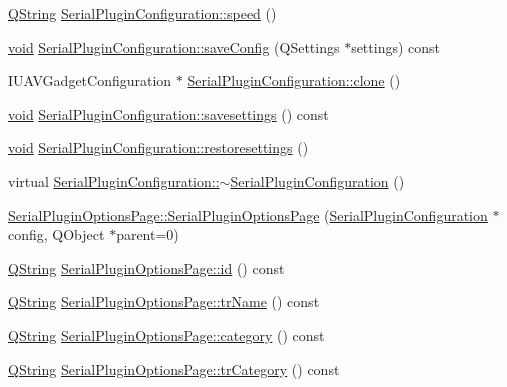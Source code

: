 \begin{DoxyCompactItemize}
\item 
\hyperlink{group___u_a_v_objects_plugin_gab9d252f49c333c94a72f97ce3105a32d}{\-Q\-String} \hyperlink{group___serial_plugin_ga1e6623a11c7e9c8e52411d2568dd4e7c}{\-Serial\-Plugin\-Configuration\-::speed} ()
\item 
\hyperlink{group___u_a_v_objects_plugin_ga444cf2ff3f0ecbe028adce838d373f5c}{void} \hyperlink{group___serial_plugin_ga01715638b8bff47aaa76961d1cd11f59}{\-Serial\-Plugin\-Configuration\-::save\-Config} (\-Q\-Settings $\ast$settings) const 
\item 
\-I\-U\-A\-V\-Gadget\-Configuration $\ast$ \hyperlink{group___serial_plugin_ga894fb8aa5280cdfb94f844d09f21e64d}{\-Serial\-Plugin\-Configuration\-::clone} ()
\item 
\hyperlink{group___u_a_v_objects_plugin_ga444cf2ff3f0ecbe028adce838d373f5c}{void} \hyperlink{group___serial_plugin_ga4a63c76785f20677382b69b52b9537f0}{\-Serial\-Plugin\-Configuration\-::savesettings} () const 
\item 
\hyperlink{group___u_a_v_objects_plugin_ga444cf2ff3f0ecbe028adce838d373f5c}{void} \hyperlink{group___serial_plugin_ga9c071c1ab20bf2139e54c469ab804332}{\-Serial\-Plugin\-Configuration\-::restoresettings} ()
\item 
virtual \hyperlink{group___serial_plugin_ga02088820254dad5d594d652f0d1ac556}{\-Serial\-Plugin\-Configuration\-::$\sim$\-Serial\-Plugin\-Configuration} ()
\item 
\hyperlink{group___serial_plugin_gabbba5e225f4b24b0ff2762edd89a7c85}{\-Serial\-Plugin\-Options\-Page\-::\-Serial\-Plugin\-Options\-Page} (\hyperlink{class_serial_plugin_configuration}{\-Serial\-Plugin\-Configuration} $\ast$config, \-Q\-Object $\ast$parent=0)
\item 
\hyperlink{group___u_a_v_objects_plugin_gab9d252f49c333c94a72f97ce3105a32d}{\-Q\-String} \hyperlink{group___serial_plugin_gaadfb80c5939566ed536ef5e6d49601fd}{\-Serial\-Plugin\-Options\-Page\-::id} () const 
\item 
\hyperlink{group___u_a_v_objects_plugin_gab9d252f49c333c94a72f97ce3105a32d}{\-Q\-String} \hyperlink{group___serial_plugin_ga6558090ef30ec926b500dc27787f194a}{\-Serial\-Plugin\-Options\-Page\-::tr\-Name} () const 
\item 
\hyperlink{group___u_a_v_objects_plugin_gab9d252f49c333c94a72f97ce3105a32d}{\-Q\-String} \hyperlink{group___serial_plugin_ga11d58b7fe11ee48ac5a865eaea4d9a13}{\-Serial\-Plugin\-Options\-Page\-::category} () const 
\item 
\hyperlink{group___u_a_v_objects_plugin_gab9d252f49c333c94a72f97ce3105a32d}{\-Q\-String} \hyperlink{group___serial_plugin_ga65036a91c24758081e8a2cecc44925a0}{\-Serial\-Plugin\-Options\-Page\-::tr\-Category} () const 

\end{DoxyCompactItemize}
